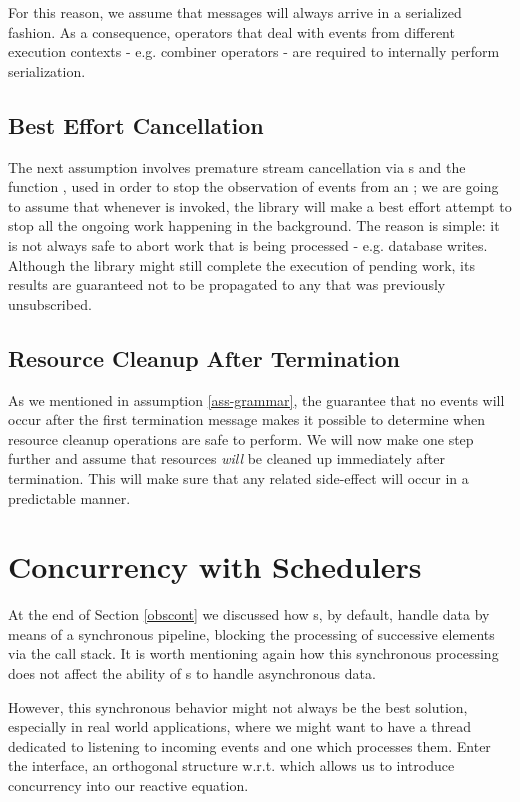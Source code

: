 For this reason, we assume that messages will always arrive in a serialized fashion. As a consequence, operators that deal with events from different execution contexts - e.g. combiner operators - are required to internally perform serialization.

\subsection{Best Effort Cancellation}
\label{ass-besteffort}
The next assumption involves premature stream cancellation via s and the function , used in order to stop the observation of events from an ; we are going to assume that whenever  is invoked, the library will make a best effort attempt to stop all the ongoing work happening in the background. The reason is simple: it is not always safe to abort work that is being processed - e.g. database writes. Although the library might still complete the execution of pending work, its results are guaranteed not to be propagated to any  that was previously unsubscribed.

\subsection{Resource Cleanup After Termination}
As we mentioned in assumption \ref{ass-grammar}, the guarantee that no events will occur after the first termination message makes it possible to determine when resource cleanup operations are safe to perform. We will now make one step further and assume that resources \textit{will} be cleaned up immediately after termination. This will make sure that any related side-effect will occur in a predictable manner.

\section{Concurrency with Schedulers}
\label{schedulers}

At the end of Section \ref{obscont} we discussed how s, by default, handle data by means of a synchronous pipeline, blocking the processing of successive elements via the call stack. It is worth mentioning again how this synchronous processing does not affect the ability of s to handle asynchronous data.

However, this synchronous behavior might not always be the best solution, especially in real world applications, where we might want to have a thread dedicated to listening to incoming events and one which processes them. Enter the  interface, an orthogonal\cite{wiki:orthogonality} structure w.r.t.  which allows us to introduce concurrency into our reactive equation. 

